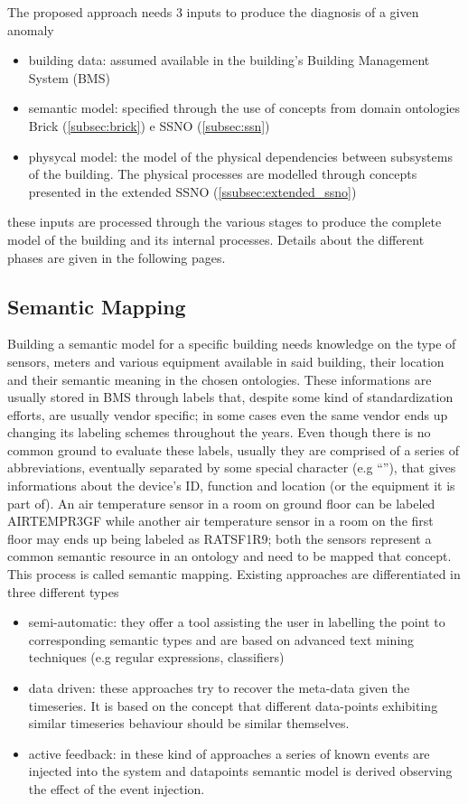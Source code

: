 The proposed approach needs 3 inputs to produce the diagnosis of a given anomaly
\begin{itemize}
  \item building data: assumed available in the building's Building Management System (BMS)
  \item semantic model: specified through the use of concepts from domain ontologies Brick (\autoref{subsec:brick}) e SSNO (\autoref{subsec:ssn})
  \item physycal model: the model of the physical dependencies between subsystems of the building. The physical processes are modelled through concepts presented in the extended SSNO (\autoref{ssubsec:extended_ssno})
\end{itemize}
these inputs are processed through the various stages to produce the complete model of the building and its internal processes. Details about the different phases are given in the following pages.

\subsection{Semantic Mapping} \label{subsec:semantic_mapping}
Building a semantic model for a specific building needs knowledge on the type of sensors, meters and various equipment available in said building, their location and their semantic meaning in the chosen ontologies. These informations are usually stored in BMS through labels that, despite some kind of standardization efforts, are usually vendor specific; in some cases even the same vendor ends up changing its labeling schemes throughout the years. Even though there is no common ground to evaluate these labels, usually they are comprised of a series of abbreviations, eventually separated by some special character (e.g ``\textunderscore''), that gives informations about the device's ID, function and location (or the equipment it is part of). An air temperature sensor in a room on ground floor can be labeled AIR\textunderscore TEMP\textunderscore R3GF while another air temperature sensor in a room on the first floor may ends up being labeled as RATSF1R9; both the sensors represent a common semantic resource in an ontology and need to be mapped that concept. This process is called semantic mapping. Existing approaches are differentiated in three different types \cite{semantic_mapping}
\begin{itemize}
  \item semi-automatic: they offer a tool assisting the user in labelling the point to corresponding semantic types and are based on advanced text mining techniques (e.g regular expressions, classifiers)
  \item data driven: these approaches try to recover the meta-data given the timeseries. It is based on the concept that different data-points exhibiting similar timeseries behaviour should be similar themselves.
  \item active feedback: in these kind of approaches a series of known events are injected into the system and datapoints semantic model is derived observing the effect of the event injection.
\end{itemize}

